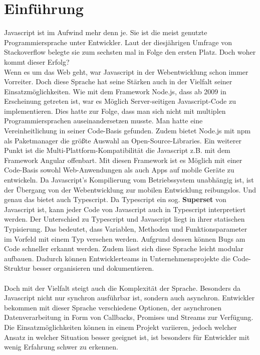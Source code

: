 \setcounter{secnumdepth}{1}

\section{Einführung}

Javascript ist im Aufwind mehr denn je. Sie ist die meist genutzte Programmiersprache unter Entwickler. Laut der diesjährigen Umfrage von Stackoverflow belegte sie zum sechsten mal in Folge den ersten Platz.\cite{programming-language-survey} Doch woher kommt dieser Erfolg? \\
Wenn es um das Web geht, war Javascript in der Webentwicklung schon immer Vorreiter. Doch diese Sprache hat seine Stärken auch in der Vielfalt seiner Einsatzmöglichkeiten. Wie mit dem Framework Node.js, dass ab 2009 in Erscheinung getreten ist, war es Möglich Server-seitigen Javascript-Code zu implementieren. Dies hatte zur Folge, dass man sich nicht mit multiplen Programmiersprachen auseinandersetzen musste. Man hatte eine Vereinheitlichung in seiner Code-Basis gefunden. Zudem bietet Node.js mit npm als Paketmanager die größte Auswahl an Open-Source-Libraries. Ein weiterer Punkt ist die Multi-Plattform-Kompatibilität die Javascript z.B. mit dem Framework Angular offenbart. Mit diesen Framework ist es Möglich mit einer Code-Basis sowohl Web-Anwendungen als auch Apps auf mobile Geräte zu entwickeln. Da Javascript's Kompilierung vom Betriebssystem unabhängig ist, ist der Übergang von der Webentwicklung zur mobilen Entwicklung reibungslos. Und genau das bietet auch Typescript. Da Typescript ein sog. \textbf{Superset} von Javascript ist, kann jeder Code von Javascript auch in Typescript interpretiert werden. Der Unterschied zu Typescript und Javascript liegt in ihrer statischen Typisierung. Das bedeutet, dass Variablen, Methoden und Funktionsparameter im Vorfeld mit einem Typ versehen werden. Aufgrund dessen können Bugs am Code schneller erkannt werden. Zudem lässt sich diese Sprache leicht modular aufbauen. Dadurch können Entwicklerteams in Unternehmensprojekte die Code-Struktur besser organisieren und dokumentieren.\\\\

\noindent
Doch mit der Vielfalt steigt auch die Komplexität der Sprache. Besonders da Javascript nicht nur synchron ausführbar ist, sondern auch asynchron. Entwickler bekommen mit dieser Sprache verschiedene Optionen, der asynchronen Datenverarbeitung in Form von Callbacks, Promises und Streams zur Verfügung. Die Einsatzmöglichkeiten können in einem Projekt variieren, jedoch welcher Ansatz in welcher Situation besser geeignet ist, ist besonders für Entwickler mit wenig Erfahrung schwer zu erkennen.

